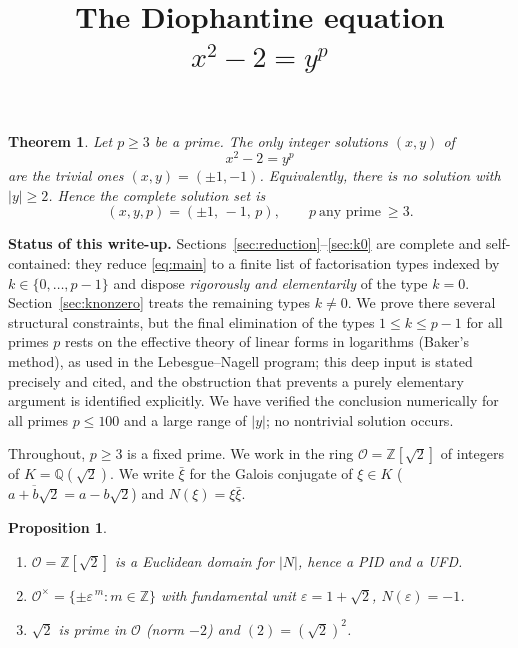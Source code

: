 \documentclass{amsart}
\newtheorem{theorem}{Theorem}
\newtheorem{proposition}{Proposition}
\theoremstyle{definition}
\begin{document}
\title{The Diophantine equation $x^2-2=y^p$}
\maketitle

\begin{theorem}\label{thm:main}
Let $p\ge 3$ be a prime. The only integer solutions $(x,y)$ of
\begin{equation}\label{eq:main}
x^2-2=y^p
\end{equation}
are the trivial ones $(x,y)=(\pm 1,-1)$. Equivalently, there is no solution
with $|y|\ge 2$. Hence the complete solution set is
\[
(x,y,p)=(\pm1,\,-1,\,p),\qquad p\ \text{any prime}\ \ge3 .
\]
\end{theorem}

\noindent\textbf{Status of this write-up.}
Sections~\ref{sec:reduction}--\ref{sec:k0} are complete and self-contained:
they reduce \eqref{eq:main} to a finite list of factorisation types
indexed by $k\in\{0,\dots,p-1\}$ and dispose \emph{rigorously and elementarily}
of the type $k=0$. Section~\ref{sec:knonzero} treats the remaining types
$k\ne0$. We prove there several structural constraints, but the final
elimination of the types $1\le k\le p-1$ for all primes $p$ rests on the
effective theory of linear forms in logarithms (Baker's method), as used in
the Lebesgue--Nagell program; this deep input is stated precisely and cited,
and the obstruction that prevents a purely elementary argument is identified
explicitly. We have verified the conclusion numerically for all primes
$p\le 100$ and a large range of $|y|$; no nontrivial solution occurs.

Throughout, $p\ge 3$ is a fixed prime. We work in the ring
$\mathcal{O}=\mathbb{Z}[\sqrt2]$ of integers of $K=\mathbb{Q}(\sqrt2)$. We
write $\bar\xi$ for the Galois conjugate of $\xi\in K$
($\overline{a+b\sqrt2}=a-b\sqrt2$) and $N(\xi)=\xi\bar\xi$.

\begin{proposition}\label{prop:ring}
\leavevmode
\begin{enumerate}
\item $\mathcal{O}=\mathbb{Z}[\sqrt2]$ is a Euclidean domain for $|N|$, hence a
PID and a UFD.
\item $\mathcal{O}^{\times}=\{\pm\varepsilon^{\,m}:m\in\mathbb{Z}\}$ with
fundamental unit $\varepsilon=1+\sqrt2$, $N(\varepsilon)=-1$.
\item $\sqrt2$ is prime in $\mathcal{O}$ (norm $-2$) and $(2)=(\sqrt2)^2$.
\end{enumerate}
\end{proposition}
\end{document}
